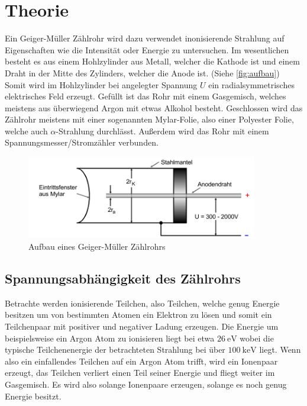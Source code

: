 \section{Theorie}
\label{sec:Theorie}

Ein Geiger-Müller Zählrohr wird dazu verwendet inonisierende Strahlung auf Eigenschaften wie die Intensität oder Energie zu untersuchen.
Im wesentlichen besteht es aus einem Hohlzylinder aus Metall, welcher die Kathode ist und einem Draht in der Mitte des Zylinders, welcher die Anode ist. (Siehe \autoref{fig:aufbau})
Somit wird im Hohlzylinder bei angelegter Spannung $U$ ein radialsymmetrisches elektrisches Feld erzeugt.
Gefüllt ist das Rohr mit einem Gasgemisch, welches meistens aus überwiegend Argon mit etwas Alkohol besteht.
Geschlossen wird das Zählrohr meistens mit einer sogenannten Mylar-Folie, also einer Polyester Folie, welche auch $\alpha$-Strahlung durchlässt.
Außerdem wird das Rohr mit einem Spannungsmesser/Stromzähler verbunden.

\begin{figure}
    \centering
    \includegraphics[width=0.9\textwidth]{images/skizze_0.png}
    \caption{Aufbau eines Geiger-Müller Zählrohrs\cite{V703}}
    \label{fig:aufbau}
\end{figure}

\subsection{Spannungsabhängigkeit des Zählrohrs}
\label{ssec:wirkungsweise}

Betrachte werden ionisierende Teilchen, also Teilchen, welche genug Energie besitzen um von bestimmten Atomen ein Elektron zu lösen und somit ein Teilchenpaar mit positiver und negativer Ladung erzeugen.
Die Energie um beispielsweise ein Argon Atom zu ionisieren liegt bei etwa $\SI{26}{\electronvolt}$ wobei die typische Teilchenenergie der betrachteten Strahlung bei über $\SI{100}{\kilo\electronvolt}$ liegt.
Wenn also ein einfallendes Teilchen auf ein Argon Atom trifft, wird ein Ionenpaar erzeugt, das Teilchen verliert einen Teil seiner Energie und fliegt weiter im Gasgemisch.
Es wird also solange Ionenpaare erzeugen, solange es noch genug Energie besitzt.

